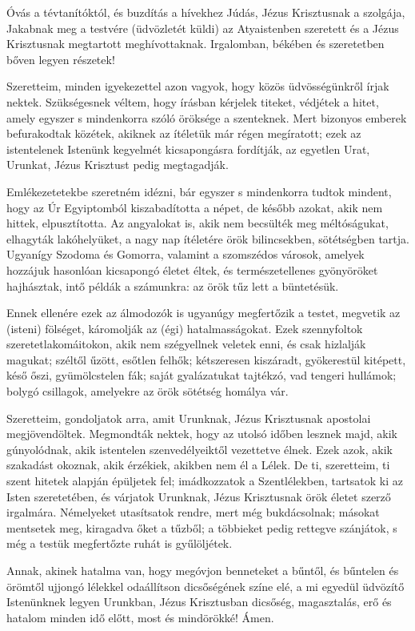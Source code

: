 \documentclass[twoside]{article}
\begin{document}
\begin{lectio}{Óvás a tévtanítóktól, és buzdítás a hívekhez}
\noindent Júdás, Jézus Krisztusnak a szolgája, Jakabnak meg a testvére (üdvözletét küldi) az Atyaistenben szeretett és a Jézus Krisztusnak megtartott meghívottaknak. Irgalomban, békében és szeretetben bőven legyen részetek!

Szeretteim, minden igyekezettel azon vagyok, hogy közös üdvösségünkről írjak nektek. Szükségesnek véltem, hogy írásban kérjelek titeket, védjétek a hitet, amely egyszer s mindenkorra szóló öröksége a szenteknek. Mert bizonyos emberek befurakodtak közétek, akiknek az ítéletük már régen megíratott; ezek az istentelenek Istenünk kegyelmét kicsapongásra fordítják, az egyetlen Urat, Urunkat, Jézus Krisztust pedig megtagadják.

Emlékezetetekbe szeretném idézni, bár egyszer s mindenkorra tudtok mindent, hogy az Úr Egyiptomból kiszabadította a népet, de később azokat, akik nem hittek, elpusztította. Az angyalokat is, akik nem becsülték meg méltóságukat, elhagyták lakóhelyüket, a nagy nap ítéletére örök bilincsekben, sötétségben tartja. Ugyanígy Szodoma és Gomorra, valamint a szomszédos városok, amelyek hozzájuk hasonlóan kicsapongó életet éltek, és természetellenes gyönyöröket hajhásztak, intő példák a számunkra: az örök tűz lett a büntetésük.

Ennek ellenére ezek az álmodozók is ugyanúgy megfertőzik a testet, megvetik az (isteni) fölséget, káromolják az (égi) hatalmasságokat. Ezek szennyfoltok szeretetlakomáitokon, akik nem szégyellnek veletek enni, és csak hizlalják magukat; széltől űzött, esőtlen felhők; kétszeresen kiszáradt, gyökerestül kitépett, késő őszi, gyümölcstelen fák; saját gyalázatukat tajtékzó, vad tengeri hullámok; bolygó csillagok, amelyekre az örök sötétség homálya vár.

Szeretteim, gondoljatok arra, amit Urunknak, Jézus Krisztusnak apostolai megjövendöltek. Megmondták nektek, hogy az utolsó időben lesznek majd, akik gúnyolódnak, akik istentelen szenvedélyeiktől vezettetve élnek. Ezek azok, akik szakadást okoznak, akik érzékiek, akikben nem él a Lélek. De ti, szeretteim, ti szent hitetek alapján épüljetek fel; imádkozzatok a Szentlélekben, tartsatok ki az Isten szeretetében, és várjatok Urunknak, Jézus Krisztusnak örök életet szerző irgalmára. Némelyeket utasítsatok rendre, mert még bukdácsolnak; másokat mentsetek meg, kiragadva őket a tűzből; a többieket pedig rettegve szánjátok, s még a testük megfertőzte ruhát is gyűlöljétek.

Annak, akinek hatalma van, hogy megóvjon benneteket a bűntől, és bűntelen és örömtől ujjongó lélekkel odaállítson dicsőségének színe elé, a mi egyedül üdvözítő Istenünknek legyen Urunkban, Jézus Krisztusban dicsőség, magasztalás, erő és hatalom minden idő előtt, most és mindörökké! Ámen.
\end{lectio}
\end{document}
